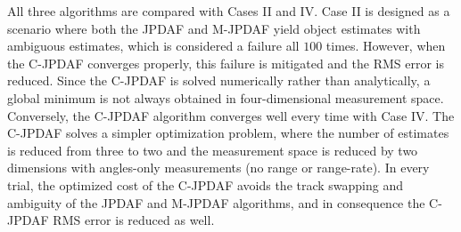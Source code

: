 All three algorithms are compared with Cases II and IV. Case II is designed as a scenario where both the JPDAF and M-JPDAF yield object estimates with ambiguous estimates, which is considered a failure all $100$ times.
However, when the C-JPDAF converges properly, this failure is mitigated and the RMS error is reduced.
Since the C-JPDAF is solved numerically rather than analytically, a global minimum is not always obtained in four-dimensional measurement space.
Conversely, the C-JPDAF algorithm converges well every time with Case IV. The C-JPDAF solves a simpler optimization problem, where the number of estimates is reduced from three to two and the measurement space is reduced by two dimensions with angles-only measurements (no range or range-rate).
In every trial, the optimized cost of the C-JPDAF avoids the track swapping and ambiguity of the JPDAF and M-JPDAF algorithms, and in consequence the C-JPDAF RMS error is reduced as well.

